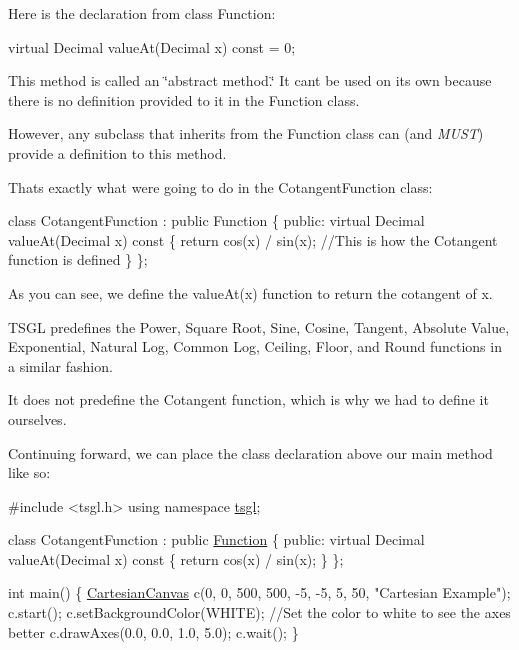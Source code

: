 Here is the declaration from class Function\+:


\begin{DoxyCode}
\textcolor{keyword}{virtual} Decimal valueAt(Decimal x) \textcolor{keyword}{const} = 0;
\end{DoxyCode}


This method is called an \char`\"{}abstract method.\char`\"{} It can\textquotesingle{}t be used on its own because there is no definition provided to it in the Function class.

However, any subclass that inherits from the Function class can (and {\itshape M\+U\+S\+T}) provide a definition to this method.

That\textquotesingle{}s exactly what we\textquotesingle{}re going to do in the Cotangent\+Function class\+:


\begin{DoxyCode}
\textcolor{keyword}{class }CotangentFunction : \textcolor{keyword}{public} Function \{
 \textcolor{keyword}{public}:
    \textcolor{keyword}{virtual} Decimal valueAt(Decimal x)\textcolor{keyword}{ const }\{
      \textcolor{keywordflow}{return} cos(x) / sin(x);  \textcolor{comment}{//This is how the Cotangent function is defined}
    \}
\};
\end{DoxyCode}


As you can see, we define the value\+At(x) function to return the cotangent of x.

T\+S\+G\+L predefines the Power, Square Root, Sine, Cosine, Tangent, Absolute Value, Exponential, Natural Log, Common Log, Ceiling, Floor, and Round functions in a similar fashion.

It does not predefine the Cotangent function, which is why we had to define it ourselves.

Continuing forward, we can place the class declaration above our main method like so\+:


\begin{DoxyCode}
\textcolor{preprocessor}{#include <tsgl.h>}
\textcolor{keyword}{using namespace }\hyperlink{namespacetsgl}{tsgl};

\textcolor{keyword}{class }CotangentFunction : \textcolor{keyword}{public} \hyperlink{classtsgl_1_1_function}{Function} \{
 \textcolor{keyword}{public}:
    \textcolor{keyword}{virtual} Decimal valueAt(Decimal x)\textcolor{keyword}{ const }\{
      \textcolor{keywordflow}{return} cos(x) / sin(x);
    \}
\};

\textcolor{keywordtype}{int} main() \{
  \hyperlink{classtsgl_1_1_cartesian_canvas}{CartesianCanvas} c(0, 0, 500, 500, -5, -5, 5, 50, \textcolor{stringliteral}{"Cartesian Example"});
  c.start();
  c.setBackgroundColor(WHITE); \textcolor{comment}{//Set the color to white to see the axes better}
  c.drawAxes(0.0, 0.0, 1.0, 5.0);
  c.wait();
\}
\end{DoxyCode}


